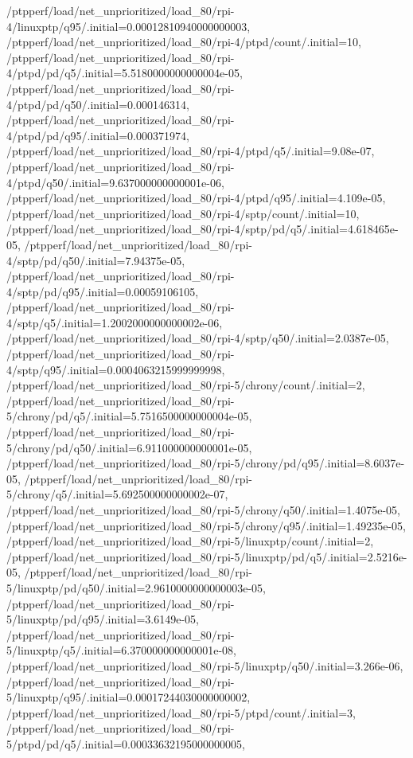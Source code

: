 {    /ptpperf/load/net_unprioritized/load_80/rpi-4/linuxptp/q95/.initial=0.00012810940000000003,
    /ptpperf/load/net_unprioritized/load_80/rpi-4/ptpd/count/.initial=10,
    /ptpperf/load/net_unprioritized/load_80/rpi-4/ptpd/pd/q5/.initial=5.5180000000000004e-05,
    /ptpperf/load/net_unprioritized/load_80/rpi-4/ptpd/pd/q50/.initial=0.000146314,
    /ptpperf/load/net_unprioritized/load_80/rpi-4/ptpd/pd/q95/.initial=0.000371974,
    /ptpperf/load/net_unprioritized/load_80/rpi-4/ptpd/q5/.initial=9.08e-07,
    /ptpperf/load/net_unprioritized/load_80/rpi-4/ptpd/q50/.initial=9.637000000000001e-06,
    /ptpperf/load/net_unprioritized/load_80/rpi-4/ptpd/q95/.initial=4.109e-05,
    /ptpperf/load/net_unprioritized/load_80/rpi-4/sptp/count/.initial=10,
    /ptpperf/load/net_unprioritized/load_80/rpi-4/sptp/pd/q5/.initial=4.618465e-05,
    /ptpperf/load/net_unprioritized/load_80/rpi-4/sptp/pd/q50/.initial=7.94375e-05,
    /ptpperf/load/net_unprioritized/load_80/rpi-4/sptp/pd/q95/.initial=0.00059106105,
    /ptpperf/load/net_unprioritized/load_80/rpi-4/sptp/q5/.initial=1.2002000000000002e-06,
    /ptpperf/load/net_unprioritized/load_80/rpi-4/sptp/q50/.initial=2.0387e-05,
    /ptpperf/load/net_unprioritized/load_80/rpi-4/sptp/q95/.initial=0.0004063215999999998,
    /ptpperf/load/net_unprioritized/load_80/rpi-5/chrony/count/.initial=2,
    /ptpperf/load/net_unprioritized/load_80/rpi-5/chrony/pd/q5/.initial=5.7516500000000004e-05,
    /ptpperf/load/net_unprioritized/load_80/rpi-5/chrony/pd/q50/.initial=6.911000000000001e-05,
    /ptpperf/load/net_unprioritized/load_80/rpi-5/chrony/pd/q95/.initial=8.6037e-05,
    /ptpperf/load/net_unprioritized/load_80/rpi-5/chrony/q5/.initial=5.692500000000002e-07,
    /ptpperf/load/net_unprioritized/load_80/rpi-5/chrony/q50/.initial=1.4075e-05,
    /ptpperf/load/net_unprioritized/load_80/rpi-5/chrony/q95/.initial=1.49235e-05,
    /ptpperf/load/net_unprioritized/load_80/rpi-5/linuxptp/count/.initial=2,
    /ptpperf/load/net_unprioritized/load_80/rpi-5/linuxptp/pd/q5/.initial=2.5216e-05,
    /ptpperf/load/net_unprioritized/load_80/rpi-5/linuxptp/pd/q50/.initial=2.9610000000000003e-05,
    /ptpperf/load/net_unprioritized/load_80/rpi-5/linuxptp/pd/q95/.initial=3.6149e-05,
    /ptpperf/load/net_unprioritized/load_80/rpi-5/linuxptp/q5/.initial=6.370000000000001e-08,
    /ptpperf/load/net_unprioritized/load_80/rpi-5/linuxptp/q50/.initial=3.266e-06,
    /ptpperf/load/net_unprioritized/load_80/rpi-5/linuxptp/q95/.initial=0.00017244030000000002,
    /ptpperf/load/net_unprioritized/load_80/rpi-5/ptpd/count/.initial=3,
    /ptpperf/load/net_unprioritized/load_80/rpi-5/ptpd/pd/q5/.initial=0.00033632195000000005,
}
